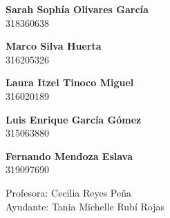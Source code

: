 \begin{titlepage}
    \vspace{5mm}
    
    \begin{minipage}{0.4\textwidth}
            \textbf{\large{Sarah Sophía Olivares García}}\\
            318360638
    \end{minipage}
    \begin{minipage}{0.4\textwidth}
        \begin{flushright}
            \textbf{\large{Marco Silva Huerta}}\\
            316205326        
        \end{flushright}
    \end{minipage}
    
    \vspace{5mm}
    
    \begin{minipage}{0.4\textwidth}
            \textbf{\large{Laura Itzel Tinoco Miguel}}\\
            316020189
    \end{minipage}
    \begin{minipage}{0.4\textwidth}
        \begin{flushright}
            \textbf{\large{Luis Enrique García Gómez}}\\    
            315063880
        \end{flushright}
    \end{minipage}

    \vspace{5mm}
    
    \begin{minipage}{0.4\textwidth}
            \textbf{\large{Fernando Mendoza Eslava}}\\
            319097690
    \end{minipage}
    \begin{minipage}{0.4\textwidth}
        \begin{flushright}
            
        \end{flushright}
    \end{minipage}
    
    \vspace{12mm}
    
    \begin{minipage}{0.8\textwidth}
        \begin{flushleft} \large
            Profesora: Cecilia Reyes Peña\\            
            Ayudante: Tania Michelle Rubí Rojas\\                    
        \end{flushleft}
    \end{minipage}
    

\end{titlepage}
